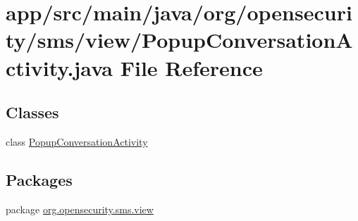 \hypertarget{a00030}{\section{app/src/main/java/org/opensecurity/sms/view/\+Popup\+Conversation\+Activity.java File Reference}
\label{a00030}
}
\subsection*{Classes}
\begin{DoxyCompactItemize}
\item 
class \hyperlink{a00012}{Popup\+Conversation\+Activity}
\end{DoxyCompactItemize}
\subsection*{Packages}
\begin{DoxyCompactItemize}
\item 
package \hyperlink{a00040}{org.\+opensecurity.\+sms.\+view}
\end{DoxyCompactItemize}
